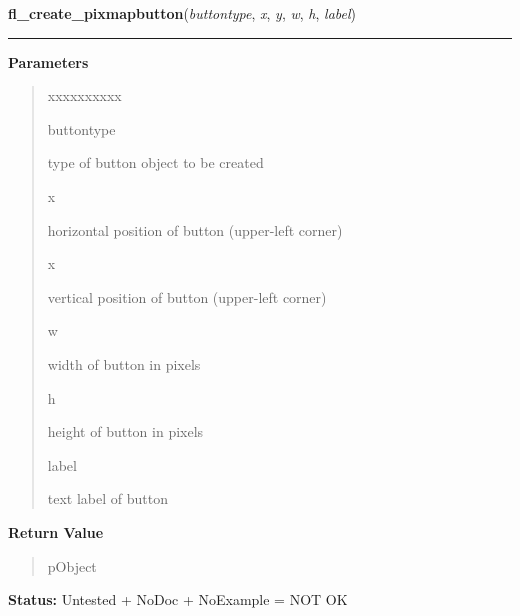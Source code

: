     \label{xformslib:library:fl_create_pixmapbutton}

    \vspace{0.5ex}

\hspace{.8\funcindent}\begin{boxedminipage}{\funcwidth}

    \raggedright \textbf{fl\_create\_pixmapbutton}(\textit{buttontype}, \textit{x}, \textit{y}, \textit{w}, \textit{h}, \textit{label})

    \vspace{-1.5ex}

    \rule{\textwidth}{0.5\fboxrule}
\setlength{\parskip}{2ex}
\setlength{\parskip}{1ex}
      \textbf{Parameters}
      \vspace{-1ex}

      \begin{quote}
        \begin{Ventry}{xxxxxxxxxx}

          \item[buttontype]

          type of button object to be created

          \item[x]

          horizontal position of button (upper-left corner)

          \item[x]

          vertical position of button (upper-left corner)

          \item[w]

          width of button in pixels

          \item[h]

          height of button in pixels

          \item[label]

          text label of button

        \end{Ventry}

      \end{quote}

      \textbf{Return Value}
    \vspace{-1ex}

      \begin{quote}
      pObject

      \end{quote}

\textbf{Status:} Untested + NoDoc + NoExample = NOT OK



    \end{boxedminipage}

